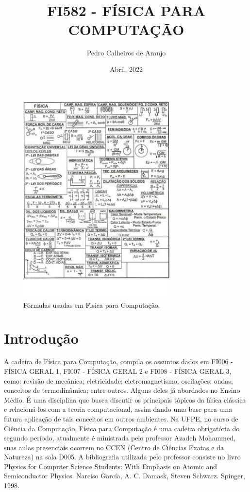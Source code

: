 \documentclass[12pt]{article}
\title{FI582 - FÍSICA PARA COMPUTAÇÃO}
\author{Pedro Calheiros de Araujo}
\date{Abril, 2022}
\begin{document}
\maketitle

\begin{figure}[h!]
\centering
    \includegraphics[width=80mm]{formulas.jpeg}
    \caption{Formulas usadas em Fisica para Computação. \cite{img:graph}}
    \label{fig:graph1}
\end{figure}

\section{Introdução}
\par 
A cadeira de Física para Computação, compila os assuntos dados em FI006 - FÍSICA GERAL 1, FI007 - FÍSICA GERAL 2 e FI008 - FÍSICA GERAL 3, como: revisão de mecânica; eletricidade; eletromagnetismo; oscilações; ondas; conceitos de termodinâmica; entre outros. Alguns deles já abordados no Ensino Médio. É uma disciplina que busca discutir os principais tópicos da física clássica e relacioná-los com a teoria computacional, assim dando uma base para uma futura aplicação de tais conceitos em outros ambientes. Na UFPE, no curso de Ciência da Computação, Física para Computação é uma cadeira obrigatória do segundo período, atualmente é ministrada pelo professor Azadeh Mohammed, suas aulas presenciais ocorrem no CCEN (Centro de Ciências Exatas e da Natureza) na sala D005. A bibliografia utilizada pelo professor consiste no livro Physics for Computer Science Students: With Emphasis on Atomic and Semiconductor Physics. Narciso García, A. C. Damask, Steven Schwarz. Spinger, 1998.
\cite{fonte:CInWiki}
\cite{fonte:SIGA}
\cite{fonte:WIKI}
\cite{fonte:FC}
\end{document}
